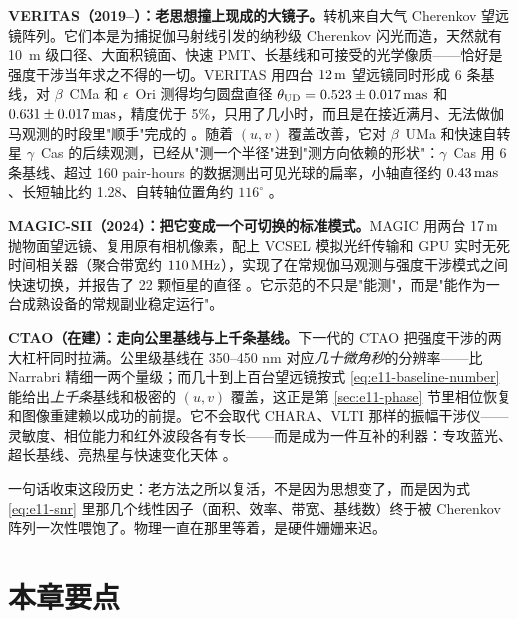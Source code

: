 \textbf{VERITAS（2019--）：老思想撞上现成的大镜子。}转机来自大气 Cherenkov 望远镜阵列。它们本是为捕捉伽马射线引发的纳秒级 Cherenkov 闪光而造，天然就有 10~m 级口径、大面积镜面、快速 PMT、长基线和可接受的光学像质——恰好是强度干涉当年求之不得的一切。VERITAS 用四台 \(12\,{\rm m}\) 望远镜同时形成 6 条基线，对 \(\beta\)~CMa 和 \(\epsilon\)~Ori 测得均匀圆盘直径 \(\theta_{\rm UD}=0.523\pm0.017\,{\rm mas}\) 和 \(0.631\pm0.017\,{\rm mas}\)，精度优于 5\%，只用了几小时，而且是在接近满月、无法做伽马观测的时段里"顺手"完成的 \citep{2020NatAs...4.1164A}。随着 \((u,v)\) 覆盖改善，它对 \(\beta\)~UMa 和快速自转星 \(\gamma\)~Cas 的后续观测，已经从"测一个半径"进到"测方向依赖的形状"：\(\gamma\)~Cas 用 6 条基线、超过 160 pair-hours 的数据测出可见光球的扁率，小轴直径约 \(0.43\,{\rm mas}\)、长短轴比约 1.28、自转轴位置角约 \(116^\circ\) \citep{2024ApJ...966...28A,2025ApJ...995..191A}。

\textbf{MAGIC-SII（2024）：把它变成一个可切换的标准模式。}MAGIC 用两台 \(17\,{\rm m}\) 抛物面望远镜、复用原有相机像素，配上 VCSEL 模拟光纤传输和 GPU 实时无死时间相关器（聚合带宽约 \(110\,{\rm MHz}\)），实现了在常规伽马观测与强度干涉模式之间快速切换，并报告了 22 颗恒星的直径 \citep{2024MNRAS.529.4387A}。它示范的不只是"能测"，而是"能作为一台成熟设备的常规副业稳定运行"。

\textbf{CTAO（在建）：走向公里基线与上千条基线。}下一代的 CTAO 把强度干涉的两大杠杆同时拉满。公里级基线在 350--450 nm 对应\emph{几十微角秒}的分辨率——比 Narrabri 精细一两个量级；而几十到上百台望远镜按式 \eqref{eq:e11-baseline-number} 能给出\emph{上千条}基线和极密的 \((u,v)\) 覆盖，这正是第 \ref{sec:e11-phase} 节里相位恢复和图像重建赖以成功的前提。它不会取代 CHARA、VLTI 那样的振幅干涉仪——灵敏度、相位能力和红外波段各有专长——而是成为一件互补的利器：专攻蓝光、超长基线、亮热星与快速变化天体 \citep{2013APh....43..331D,2014SPIE.9146E..0ZD}。

一句话收束这段历史：老方法之所以复活，不是因为思想变了，而是因为式 \eqref{eq:e11-snr} 里那几个线性因子（面积、效率、带宽、基线数）终于被 Cherenkov 阵列一次性喂饱了。物理一直在那里等着，是硬件姗姗来迟。

\section{本章要点}
\label{sec:e11-summary}

